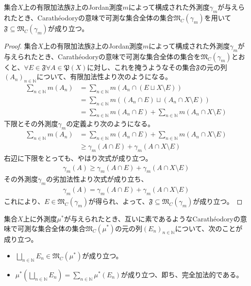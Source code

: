 \documentclass[dvipdfmx]{jsarticle}
\begin{document}
\begin{thm}\label{4.5.3.5}
集合$X$上の有限加法族$\mathfrak{F}$上のJordan測度$m$によって構成された外測度$\gamma_{m}$が与えられたとき、Carathéodoryの意味で可測な集合全体の集合$\mathfrak{M}_{C}\left( \gamma_{m} \right)$を用いて$\mathfrak{F \subseteq}\mathfrak{M}_{C}\left( \gamma_{m} \right)$が成り立つ。
\end{thm}
\begin{proof}
集合$X$上の有限加法族$\mathfrak{F}$上のJordan測度$m$によって構成された外測度$\gamma_{m}$が与えられたとき、Carathéodoryの意味で可測な集合全体の集合を$\mathfrak{M}_{C}\left( \gamma_{m} \right)$とおくと、$\forall E \in \mathfrak{F\forall}A \in \mathfrak{P}(X)$に対し、これを掩うようなその集合$\mathfrak{F}$の元の列$\left( A_{n} \right)_{n \in \mathbb{N}}$について、有限加法性より次のようになる。
\begin{align*}
\sum_{n \in \mathbb{N}} {m\left( A_{n} \right)} &= \sum_{n \in \mathbb{N}} {m\left( A_{n} \cap (E \sqcup X \setminus E) \right)}\\
&= \sum_{n \in \mathbb{N}} {m\left( \left( A_{n} \cap E \right) \sqcup \left( A_{n} \cap X \setminus E \right) \right)}\\
&= \sum_{n \in \mathbb{N}} {m\left( A_{n} \cap E \right)} + \sum_{n \in \mathbb{N}} {m\left( A_{n} \cap X \setminus E \right)}
\end{align*}
下限とその外測度$\gamma_{m}$の定義より次のようになる。
\begin{align*}
\sum_{n \in \mathbb{N}} {m\left( A_{n} \right)} &= \sum_{n \in \mathbb{N}} {m\left( A_{n} \cap E \right)} + \sum_{n \in \mathbb{N}} {m\left( A_{n} \cap X \setminus E \right)}\\
&\geq \gamma_{m}(A \cap E) + \gamma_{m}(A \cap X \setminus E)
\end{align*}
右辺に下限をとっても、やはり次式が成り立つ。
\begin{align*}
\gamma_{m}(A) \geq \gamma_{m}(A \cap E) + \gamma_{m}(A \cap X \setminus E)
\end{align*}
その外測度$\gamma_{m}$の劣加法性より次式が成り立ち、
\begin{align*}
\gamma_{m}(A) = \gamma_{m}(A \cap E) + \gamma_{m}(A \cap X \setminus E)
\end{align*}
これにより、$E \in \mathfrak{M}_{C}\left( \gamma_{m} \right)$が得られ、よって、$\mathfrak{F \subseteq}\mathfrak{M}_{C}\left( \gamma_{m} \right)$が成り立つ。
\end{proof}
\begin{thm}\label{4.5.3.6}
集合$X$上に外測度$\mu^{*}$が与えられたとき、互いに素であるようなCarathéodoryの意味で可測な集合全体の集合$\mathfrak{M}_{C}\left( \mu^{*} \right)$の元の列$\left( E_{n} \right)_{n \in \mathbb{N}}$について、次のことが成り立つ。
\begin{itemize}
\item
  $\bigsqcup_{n \in \mathbb{N}} E_{n} \in \mathfrak{M}_{C}\left( \mu^{*} \right)$が成り立つ。
\item
  $\mu^{*}\left( \bigsqcup_{n \in \mathbb{N}} E_{n} \right) = \sum_{n \in \mathbb{N}} {\mu^{*}\left( E_{n} \right)}$が成り立つ、即ち、完全加法的である。
\end{itemize}
\end{thm}
\end{document}
